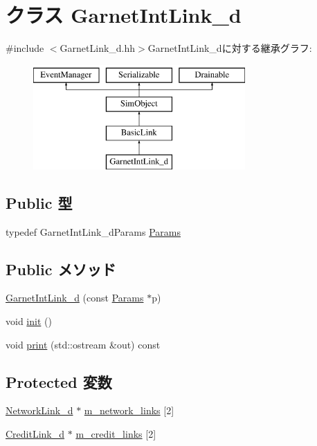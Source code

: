 \hypertarget{classGarnetIntLink__d}{
\section{クラス GarnetIntLink\_\-d}
\label{classGarnetIntLink__d}
}


{\ttfamily \#include $<$GarnetLink\_\-d.hh$>$}GarnetIntLink\_\-dに対する継承グラフ:\begin{figure}[H]
\begin{center}
\leavevmode
\includegraphics[height=4cm]{classGarnetIntLink__d}
\end{center}
\end{figure}
\subsection*{Public 型}
\begin{DoxyCompactItemize}
\item 
typedef GarnetIntLink\_\-dParams \hyperlink{classGarnetIntLink__d_a2e35ff7b9010a16d0099e9c6017f4fac}{Params}
\end{DoxyCompactItemize}
\subsection*{Public メソッド}
\begin{DoxyCompactItemize}
\item 
\hyperlink{classGarnetIntLink__d_a7917933bd82e7ba3a9ca9f9122fefc17}{GarnetIntLink\_\-d} (const \hyperlink{classGarnetIntLink__d_a2e35ff7b9010a16d0099e9c6017f4fac}{Params} $\ast$p)
\item 
void \hyperlink{classGarnetIntLink__d_a02fd73d861ef2e4aabb38c0c9ff82947}{init} ()
\item 
void \hyperlink{classGarnetIntLink__d_ac55fe386a101fbae38c716067c9966a0}{print} (std::ostream \&out) const 
\end{DoxyCompactItemize}
\subsection*{Protected 変数}
\begin{DoxyCompactItemize}
\item 
\hyperlink{classNetworkLink__d}{NetworkLink\_\-d} $\ast$ \hyperlink{classGarnetIntLink__d_ab17adecfd76f3cd9cdd715b6e49dc199}{m\_\-network\_\-links} \mbox{[}2\mbox{]}
\item 
\hyperlink{classCreditLink__d}{CreditLink\_\-d} $\ast$ \hyperlink{classGarnetIntLink__d_a860e58e5ab24bd1c98b1af5d9054ee8c}{m\_\-credit\_\-links} \mbox{[}2\mbox{]}
\end{DoxyCompactItemize}
